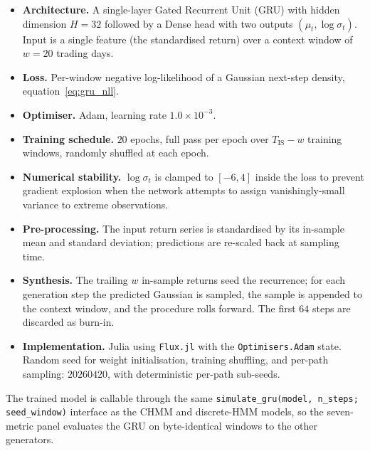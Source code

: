 \begin{itemize}
    \item \textbf{Architecture.} A single-layer Gated Recurrent Unit (GRU)
    with hidden dimension $H = 32$ followed by a Dense head with two
    outputs $(\mu_t, \log \sigma_t)$. Input is a single feature (the
    standardised return) over a context window of $w = 20$ trading days.

    \item \textbf{Loss.} Per-window negative log-likelihood of a Gaussian
    next-step density, equation~\eqref{eq:gru_nll}.

    \item \textbf{Optimiser.} Adam, learning rate $1.0 \times 10^{-3}$.

    \item \textbf{Training schedule.} $20$ epochs, full pass per epoch
    over $T_{\text{IS}} - w$ training windows, randomly shuffled at each
    epoch.

    \item \textbf{Numerical stability.} $\log \sigma_t$ is clamped to
    $[-6, 4]$ inside the loss to prevent gradient explosion when the
    network attempts to assign vanishingly-small variance to extreme
    observations.

    \item \textbf{Pre-processing.} The input return series is standardised
    by its in-sample mean and standard deviation; predictions are
    re-scaled back at sampling time.

    \item \textbf{Synthesis.} The trailing $w$ in-sample returns seed the
    recurrence; for each generation step the predicted Gaussian is
    sampled, the sample is appended to the context window, and the
    procedure rolls forward. The first $64$ steps are discarded as
    burn-in.

    \item \textbf{Implementation.} Julia using \texttt{Flux.jl}
    \cite{innes2018flux} with the \texttt{Optimisers.Adam} state.
    Random seed for weight initialisation, training shuffling, and per-path
    sampling: $20260420$, with deterministic per-path sub-seeds.
\end{itemize}

The trained model is callable through the same
\texttt{simulate\_gru(model, n\_steps; seed\_window)} interface as the
CHMM and discrete-HMM models, so the seven-metric panel evaluates the GRU
on byte-identical windows to the other generators.

